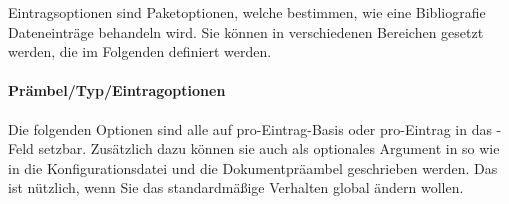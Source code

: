 \documentclass{ltxdockit}[2011/03/25]
\begin{document}
Eintragsoptionen sind Paketoptionen, welche bestimmen, wie eine Bibliografie Dateneinträge behandeln wird. Sie können in verschiedenen Bereichen gesetzt werden, die im Folgenden definiert werden.

\paragraph{Prämbel/Typ/Eintragoptionen} \label{use:opt:bib:hyb} 

Die folgenden Optionen sind alle auf pro-Eintrag-Basis oder pro-Eintrag in das -Feld setzbar.
Zusätzlich dazu können sie auch als optionales Argument in 
so wie in die Konfigurationsdatei und die Dokumentpräambel geschrieben werden.
Das ist nützlich, wenn Sie das standardmäßige Verhalten global ändern wollen.
\end{document}
